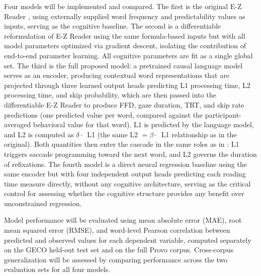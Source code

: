 \documentclass[12pt]{article}
\begin{document}
Four models will be implemented and compared. The first is the original E-Z
Reader \citep{reichle1998toward}, using externally supplied word frequency and
predictability values as inputs, serving as the cognitive baseline. The second
is a differentiable reformulation of E-Z Reader using the same formula-based
inputs but with all model parameters optimized via gradient descent, isolating
the contribution of end-to-end parameter learning. All cognitive parameters
are fit as a single global set. The third is the full
proposed model: a pretrained causal language model serves as an encoder,
producing contextual word representations that are projected through three
learned output heads predicting L1 processing time, L2 processing time, and
skip probability, which are then passed into the differentiable E-Z Reader to
produce FFD, gaze duration, TRT, and skip rate predictions (one predicted
value per word, compared against the participant-averaged behavioral value
for that word). L1 is predicted by the language model, and L2 is computed
as $\delta \cdot$~L1 (the same L2 $= \beta \cdot$~L1 relationship as in
the original). Both quantities then enter the cascade in the same roles
as in \citet{reichle1998toward}: L1 triggers saccade programming toward
the next word, and L2 governs the duration of refixations. The fourth
model is
a direct neural regression baseline using the same encoder but with four
independent output heads predicting each reading time measure directly, without
any cognitive architecture, serving as the critical control for assessing
whether the cognitive structure provides any benefit over unconstrained
regression.

Model performance will be evaluated using mean absolute error (MAE), root
mean squared error (RMSE), and word-level Pearson correlation between
predicted and observed values for each dependent variable, computed
separately on the GECO held-out test set and on the full Provo corpus.
Cross-corpus generalization will be assessed by comparing performance across
the two evaluation sets for all four models.

\newpage


\end{document}
